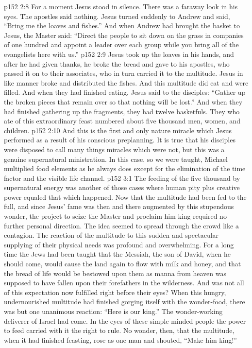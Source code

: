 \vs p152 2:8 For a moment Jesus stood in silence. There was a faraway look in his eyes. The apostles said nothing. Jesus turned suddenly to Andrew and said, \textcolor{ubdarkred}{“Bring me the loaves and fishes.”} And when Andrew had brought the basket to Jesus, the Master said: \textcolor{ubdarkred}{“Direct the people to sit down on the grass in companies of one hundred and appoint a leader over each group while you bring all of the evangelists here with us.”}
\vs p152 2:9 Jesus took up the loaves in his hands, and after he had given thanks, he broke the bread and gave to his apostles, who passed it on to their associates, who in turn carried it to the multitude. Jesus in like manner broke and distributed the fishes. And this multitude did eat and were filled. And when they had finished eating, Jesus said to the disciples: \textcolor{ubdarkred}{“Gather up the broken pieces that remain over so that nothing will be lost.”} And when they had finished gathering up the fragments, they had twelve basketfuls. They who ate of this extraordinary feast numbered about five thousand men, women, and children.
\vs p152 2:10 \pc And this is the first and only nature miracle which Jesus performed as a result of his conscious preplanning. It is true that his disciples were disposed to call many things miracles which were not, but this was a genuine supernatural ministration. In this case, so we were taught, Michael multiplied food elements as he always does except for the elimination of the time factor and the visible life channel.
\vs p152 3:1 The feeding of the five thousand by supernatural energy was another of those cases where human pity plus creative power equaled that which happened. Now that the multitude had been fed to the full, and since Jesus’ fame was then and there augmented by this stupendous wonder, the project to seize the Master and proclaim him king required no further personal direction. The idea seemed to spread through the crowd like a contagion. The reaction of the multitude to this sudden and spectacular supplying of their physical needs was profound and overwhelming. For a long time the Jews had been taught that the Messiah, the son of David, when he should come, would cause the land again to flow with milk and honey, and that the bread of life would be bestowed upon them as manna from heaven was supposed to have fallen upon their forefathers in the wilderness. And was not all of this expectation now fulfilled right before their eyes? When this hungry, undernourished multitude had finished gorging itself with the wonder\hyp{}food, there was but one unanimous reaction: “Here is our king.” The wonder\hyp{}working deliverer of Israel had come. In the eyes of these simple\hyp{}minded people the power to feed carried with it the right to rule. No wonder, then, that the multitude, when it had finished feasting, rose as one man and shouted, “Make him king!”
